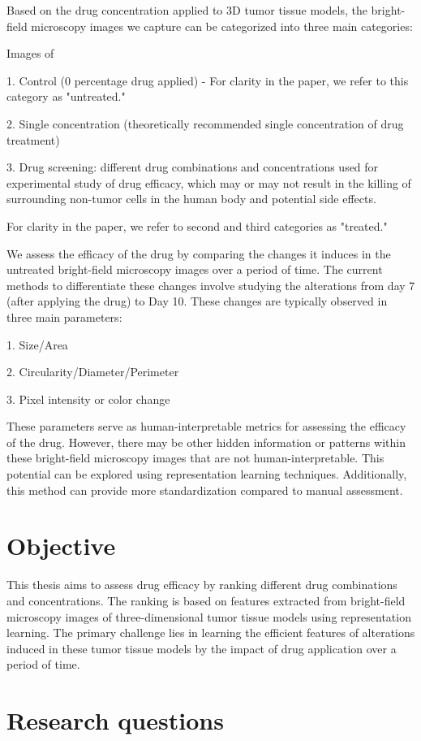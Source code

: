 \documentclass[12pt,twoside,a4paper,parskip]{scrbook} %
\begin{document}
Based on the drug concentration applied to 3D tumor tissue models, the bright-field microscopy images we capture can be categorized into three main categories:

Images of

1. Control (0 percentage drug applied) - For clarity in the paper, we refer to this category as "untreated."

2. Single concentration (theoretically recommended single concentration of drug treatment)

3. Drug screening: different drug combinations and concentrations used for experimental study of drug efficacy, which may or may not result in the killing of surrounding non-tumor cells in the human body and potential side effects.

For clarity in the paper, we refer to second and third  categories as "treated."

We assess the efficacy of the drug by comparing the changes it induces in the untreated bright-field microscopy images over a period of time. The current methods to differentiate these changes involve studying the alterations from day 7 (after applying the drug) to Day 10. These changes are typically observed in three main parameters: 

1. Size/Area

2. Circularity/Diameter/Perimeter

3. Pixel intensity or color change

These parameters serve as human-interpretable metrics for assessing the efficacy of the drug. However, there may be other hidden information or patterns within these bright-field microscopy images that are not human-interpretable. This potential can be explored using representation learning techniques. Additionally, this method can provide more standardization compared to manual assessment.
\let\cleardoublepage\clearpage
\chapter{Objective}\label{ch:Objective}
This thesis aims to assess drug efficacy by ranking different drug combinations and concentrations. The ranking is based on features extracted from bright-field microscopy images of  three-dimensional tumor tissue models using representation learning. The primary challenge lies in learning the efficient features of alterations induced in these tumor tissue models by the impact of drug application over a period of time.
\let\cleardoublepage\clearpage
\chapter{Research questions}\label{ch:Research questions}
\end{document}

